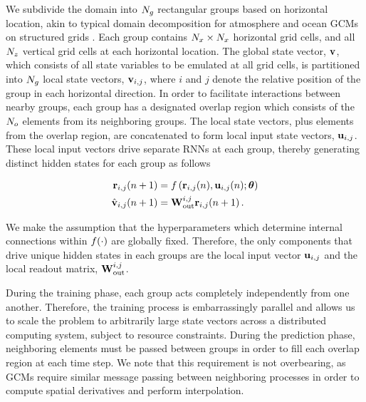 We subdivide the domain into $N_{g}$ rectangular groups based on horizontal location,
akin to typical domain decomposition for atmosphere and ocean
GCMs on structured grids .
Each group contains
$N_{x}\times N_{x}$ horizontal grid cells, and all $N_{z}$
vertical grid cells at each horizontal location.
The global state vector, $\mathbf{v}$, which consists of all state variables to be
emulated at all grid cells, is partitioned into $N_{g}$ local state vectors,
$\mathbf{v}_{i,j}$, where $i$ and $j$ denote the relative position of the group in
each horizontal direction.
In order to facilitate interactions between nearby groups, each group
has a designated overlap region which consists of the $N_{o}$ elements
from its neighboring groups.
The local state vectors, plus elements from the overlap region, are concatenated
to form local input state vectors, $\mathbf{u}_{i,j}$.
These local input vectors drive separate RNNs at each group, thereby generating
distinct hidden states for each group as follows
\begin{linenomath*}\begin{equation}
    \begin{aligned}
        \mathbf{r}_{i,j}(n+1)
        &= f\left(
            \mathbf{r}_{i,j}(n), \mathbf{u}_{i,j}(n); \bm{\theta}
        \right) \\
        \hat{\mathbf{v}}_{i,j}(n+1)
        &= \mathbf{W}_\text{out}^{i,j} \mathbf{r}_{i,j}(n+1) \, .
    \end{aligned}
    \label{eq:local-rnn}
\end{equation}\end{linenomath*}
We make the assumption that the hyperparameters which determine internal
connections within $f(\cdot)$ are globally fixed.
Therefore, the only components
that drive unique hidden states in each groups are the local input vector
$\mathbf{u}_{i,j}$ and the local readout matrix, $\mathbf{W}_\text{out}^{i,j}$.

During the training phase, each group acts completely independently from one
another.
Therefore, the training process is embarrassingly parallel and allows us to
scale the problem to arbitrarily large state vectors across a distributed
computing system, subject to resource constraints.
During the prediction phase, neighboring elements must be passed between
groups in order to fill each overlap region at each time step.
We note that this requirement is not overbearing, as GCMs require similar
message passing between neighboring processes in order to compute spatial
derivatives and perform interpolation.


